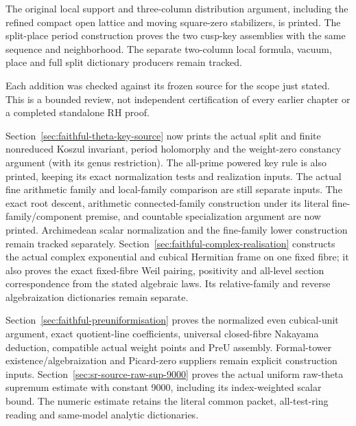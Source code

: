 The original local support and three-column distribution argument,
including the refined compact open lattice and moving square-zero
stabilizers, is printed. The split-place period construction proves
the two cusp-key assemblies with the same sequence and neighborhood.
The separate two-column local formula, vacuum, place and full split
dictionary producers remain tracked.

Each addition was checked against its frozen source for the scope
just stated. This is a bounded review, not independent certification
of every earlier chapter or a completed standalone RH proof.

Section~\ref{sec:faithful-theta-key-source} now prints the actual split
and finite nonreduced Koszul invariant, period holomorphy and the
weight-zero constancy argument (with its genus restriction).
The all-prime powered key rule is also printed, keeping its exact
normalization tests and realization inputs. The actual fine arithmetic
family and local-family comparison are still separate inputs.
The exact root descent, arithmetic connected-family construction under
its literal fine-family/component premise, and countable specialization
argument are now printed. Archimedean scalar normalization and the
fine-family lower construction remain tracked separately.
Section~\ref{sec:faithful-complex-realisation} constructs the actual
complex exponential and cubical Hermitian frame on one fixed fibre;
it also proves the exact fixed-fibre Weil pairing, positivity and all-level
section correspondence from the stated algebraic laws. Its relative-family
and reverse algebraization dictionaries remain separate.

Section~\ref{sec:faithful-preuniformisation} proves the normalized even
cubical-unit argument, exact quotient-line coefficients, universal
closed-fibre Nakayama deduction, compatible actual weight points and
PreU assembly. Formal-tower existence/algebraization and Picard-zero
suppliers remain explicit construction inputs.
Section~\ref{sec:sr-source-raw-sup-9000} proves the actual uniform raw-theta
supremum estimate with constant 9000, including its index-weighted scalar
bound. The numeric estimate retains the literal common packet, all-test-ring
reading and same-model analytic dictionaries.

